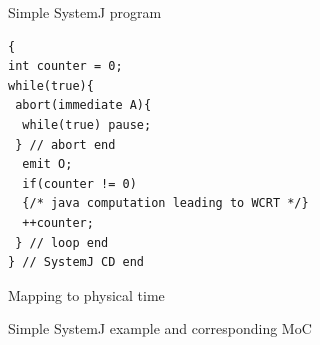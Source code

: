 \begin{figure}[t!]
\centering
\begin{SubFloat}{\label{fig:2a}Simple SystemJ program}%
	\hspace{1cm}
\begin{minipage}[b]{0.8\linewidth}%
		\begin{lstlisting}[style=sysj,morekeywords={abort,await,emit,present,trap,pause,exit,delay,suspend}]
{
int counter = 0;
while(true){
 abort(immediate A){
  while(true) pause; 
 } // abort end
  emit O;
  if(counter != 0) 
  {/* java computation leading to WCRT */}
  ++counter;
 } // loop end
} // SystemJ CD end
\end{lstlisting}%
\end{minipage}%
\end{SubFloat}

\begin{SubFloat}{\label{fig:2c}Mapping to physical time}%
\end{SubFloat}%
\caption{Simple SystemJ example and corresponding MoC}
\label{fig:2}
\end{figure}

